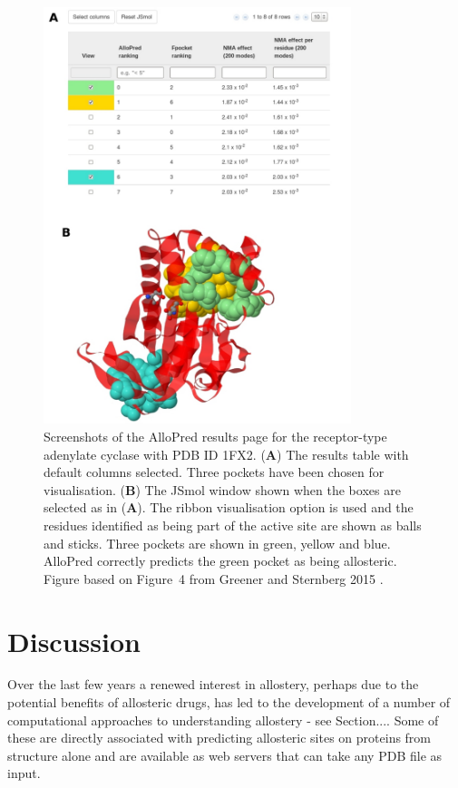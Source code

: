 \begin{figure}
\centering

\includegraphics[width=0.8\textwidth]{figures/web_results/web_results}

\caption[Screenshots of the AlloPred web server results page]
{Screenshots of the AlloPred results page for the receptor-type adenylate cyclase with PDB ID 1FX2.
(\textbf{A}) The results table with default columns selected.
Three pockets have been chosen for visualisation.
(\textbf{B}) The JSmol window shown when the boxes are selected as in (\textbf{A}).
The ribbon visualisation option is used and the residues identified as being part of the active site are shown as balls and sticks.
Three pockets are shown in green, yellow and blue.
AlloPred correctly predicts the green pocket as being allosteric.
Figure based on Figure~4 from Greener and Sternberg 2015 \cite{Greener2015}.}

\label{fig:web_results}
\end{figure}


\section{Discussion}

Over the last few years a renewed interest in allostery, perhaps due to the potential benefits of allosteric drugs, has led to the development of a number of computational approaches to understanding allostery - see Section....
Some of these are directly associated with predicting allosteric sites on proteins from structure alone and are available as web servers that can take any PDB file as input.

